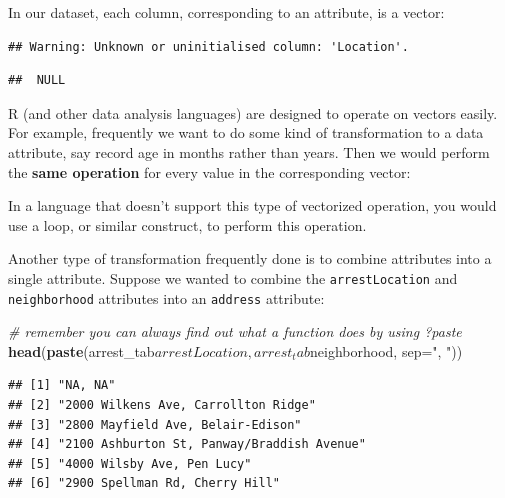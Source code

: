\documentclass[]{article}
\newenvironment{Shaded}{\begin{snugshade}}{\end{snugshade}}
\newcommand{\KeywordTok}[1]{\textcolor[rgb]{0.13,0.29,0.53}{\textbf{{#1}}}}
\newcommand{\DataTypeTok}[1]{\textcolor[rgb]{0.13,0.29,0.53}{{#1}}}
\newcommand{\DecValTok}[1]{\textcolor[rgb]{0.00,0.00,0.81}{{#1}}}
\newcommand{\StringTok}[1]{\textcolor[rgb]{0.31,0.60,0.02}{{#1}}}
\newcommand{\CommentTok}[1]{\textcolor[rgb]{0.56,0.35,0.01}{\textit{{#1}}}}
\newcommand{\NormalTok}[1]{{#1}}
\theoremstyle{definition}
\theoremstyle{definition}
\theoremstyle{remark}
\begin{document}
In our dataset, each column, corresponding to an attribute, is a vector:

\begin{Shaded}
\end{Shaded}

\begin{verbatim}
## Warning: Unknown or uninitialised column: 'Location'.
\end{verbatim}

\begin{verbatim}
##  NULL
\end{verbatim}

R (and other data analysis languages) are designed to operate on vectors
easily. For example, frequently we want to do some kind of
transformation to a data attribute, say record age in months rather than
years. Then we would perform the \textbf{same operation} for every value
in the corresponding vector:

\begin{Shaded}
\end{Shaded}

In a language that doesn't support this type of vectorized operation,
you would use a loop, or similar construct, to perform this operation.

Another type of transformation frequently done is to combine attributes
into a single attribute. Suppose we wanted to combine the
\texttt{arrestLocation} and \texttt{neighborhood} attributes into an
\texttt{address} attribute:

\begin{Shaded}
\begin{Highlighting}[]
\CommentTok{# remember you can always find out what a function does by using ?paste}
\KeywordTok{head}\NormalTok{(}\KeywordTok{paste}\NormalTok{(arrest_tab$arrestLocation, arrest_tab$neighborhood, }\DataTypeTok{sep=}\StringTok{", "}\NormalTok{))}
\end{Highlighting}
\end{Shaded}

\begin{verbatim}
## [1] "NA, NA"                                   
## [2] "2000 Wilkens Ave, Carrollton Ridge"       
## [3] "2800 Mayfield Ave, Belair-Edison"         
## [4] "2100 Ashburton St, Panway/Braddish Avenue"
## [5] "4000 Wilsby Ave, Pen Lucy"                
## [6] "2900 Spellman Rd, Cherry Hill"
\end{verbatim}
\end{document}
